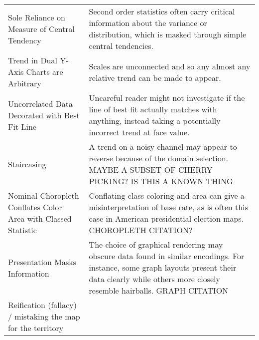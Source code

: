 \begin{longtable}{p{5cm}p{12cm}}
 \rowcolor{colorc}Sole Reliance on Measure of Central Tendency & Second order statistics often carry critical information about the variance or distribution, which is masked through simple central tendencies.  \cite{wall2017warning, few2019loom, matejka2017same, anscombe1973graphs}\\
 \rowcolor{colorc-opaque}Trend in Dual Y-Axis Charts are Arbitrary & Scales are unconnected and so any almost any relative trend can be made to appear. \cite{KindlmannAlgebraicVisPedagogyPDV2016, cairo2015graphics}\\
 \rowcolor{colorc}Uncorrelated Data Decorated with Best Fit Line & Uncareful reader might not investigate if the line of best fit actually matches with anything, instead taking a potentially incorrect trend at face value. \\
 \rowcolor{colorc-opaque}Staircasing & A trend on a noisy channel may appear to reverse because of the domain selection. MAYBE A SUBSET OF CHERRY PICKING? IS THIS A KNOWN THING\\
 \rowcolor{colorc}Nominal Choropleth Conflates Color Area with Classed Statistic & Conflating class coloring and area can give a misinterpretation of base rate, as is often this case in American presidential election maps.  \cite{gastner2005maps} CHOROPLETH CITATION?\\
 \rowcolor{colorc-opaque}Presentation Masks Information & The choice of graphical rendering may obscure data found in similar encodings. For instance, some graph layouts present their data clearly while others more closely resemble hairballs. \cite{hofmann2012graphical} GRAPH CITATION\\
 \rowcolor{colorc}Reification (fallacy) / mistaking the map for the territory &  \\


\end{longtable}
